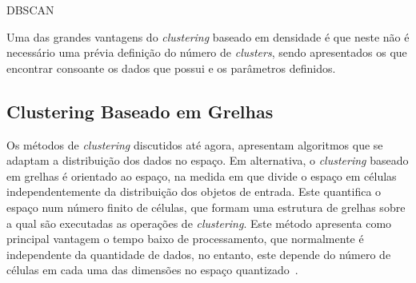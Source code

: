 \begin{algorithm}[ht]
\caption{DBSCAN}\label{dbscan}
\begin{algorithmic}[1]
	\Repeat
					\EndIf
				\EndIf
				\EndIf
			\EndFor
		\EndIf
\EndProcedure 
\end{algorithmic}
\end{algorithm}

Uma das grandes vantagens do \textit{clustering} baseado em densidade é que neste não é necessário uma prévia definição do número de \textit{clusters}, sendo apresentados os que encontrar consoante os dados que possui e os parâmetros definidos. 


\subsection{Clustering Baseado em Grelhas} %

Os métodos de \textit{clustering} discutidos até agora, apresentam algoritmos que se adaptam a distribuição dos dados no espaço. Em alternativa, o \textit{clustering} baseado em grelhas é orientado ao espaço, na medida em que divide o espaço em células independentemente da distribuição dos objetos de entrada. Este quantifica o espaço num número finito de células, que formam uma estrutura de grelhas sobre a qual são executadas as operações de \textit{clustering}. Este método apresenta como principal vantagem o tempo baixo de processamento, que normalmente é independente da quantidade de dados, no entanto, este depende do número de células em cada uma das dimensões no espaço quantizado~\cite{Han2006}.

